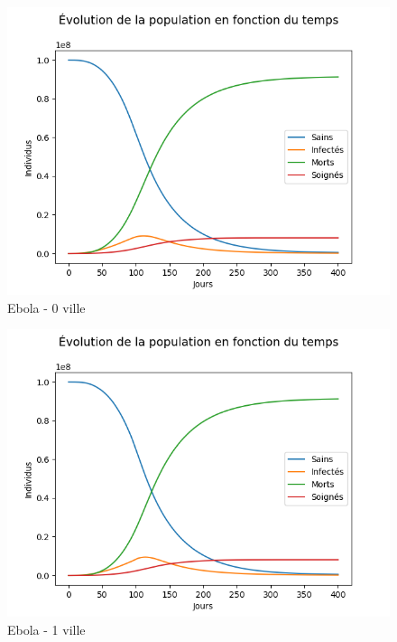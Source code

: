 \documentclass{article}
\begin{document}
\begin{figure}[H]
\caption{Ebola - 0 ville}
\centering
\includegraphics[scale=0.8]{../images/automate2_ebola_0villes.png}
\end{figure}

\begin{figure}[H]
\caption{Ebola - 1 ville}
\centering
\includegraphics[scale=0.8]{../images/automarte2_ebola_1ville_proba2.png}
\end{figure}
\end{document}
